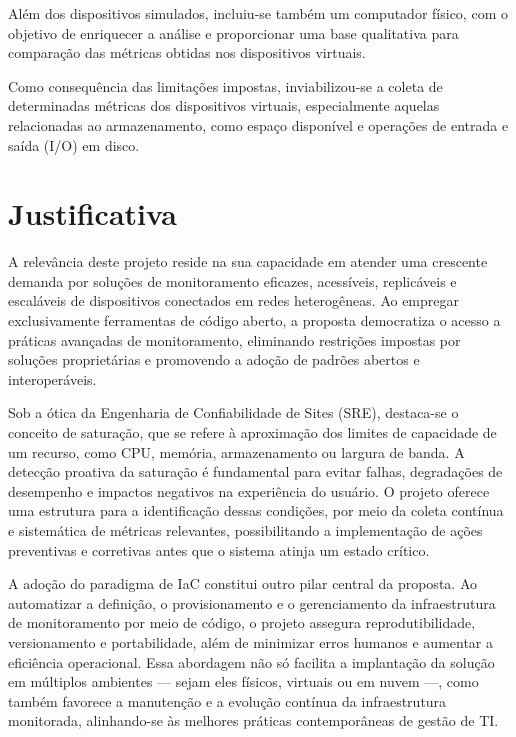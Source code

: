 Além dos dispositivos simulados, incluiu-se também um computador físico, com o objetivo de enriquecer a análise e proporcionar uma base qualitativa para comparação das métricas obtidas nos dispositivos virtuais.

Como consequência das limitações impostas, inviabilizou-se a coleta de determinadas métricas dos dispositivos virtuais, especialmente aquelas relacionadas ao armazenamento, como espaço disponível e operações de entrada e saída (I/O) em disco.

\section{Justificativa}

A relevância deste projeto reside na sua capacidade em atender uma crescente demanda por soluções de monitoramento eficazes, acessíveis, replicáveis e escaláveis de dispositivos conectados em redes heterogêneas. Ao empregar exclusivamente ferramentas de código aberto, a proposta democratiza o acesso a práticas avançadas de monitoramento, eliminando restrições impostas por soluções proprietárias e promovendo a adoção de padrões abertos e interoperáveis.

Sob a ótica da Engenharia de Confiabilidade de Sites (SRE), destaca-se o conceito de saturação, que se refere à aproximação dos limites de capacidade de um recurso, como CPU, memória, armazenamento ou largura de banda.  A detecção proativa da saturação é fundamental para evitar falhas, degradações de desempenho e impactos negativos na experiência do usuário. O projeto oferece uma estrutura para a identificação dessas condições, por meio da coleta contínua e sistemática de métricas relevantes, possibilitando a implementação de ações preventivas e corretivas antes que o sistema atinja um estado crítico.

A adoção do paradigma de IaC constitui outro pilar central da proposta. Ao automatizar a definição, o provisionamento e o gerenciamento da infraestrutura de monitoramento por meio de código, o projeto assegura reprodutibilidade, versionamento e portabilidade, além de minimizar erros humanos e aumentar a eficiência operacional. Essa abordagem não só facilita a implantação da solução em múltiplos ambientes — sejam eles físicos, virtuais ou em nuvem —, como também favorece a manutenção e a evolução contínua da infraestrutura monitorada, alinhando-se às melhores práticas contemporâneas de gestão de TI.


